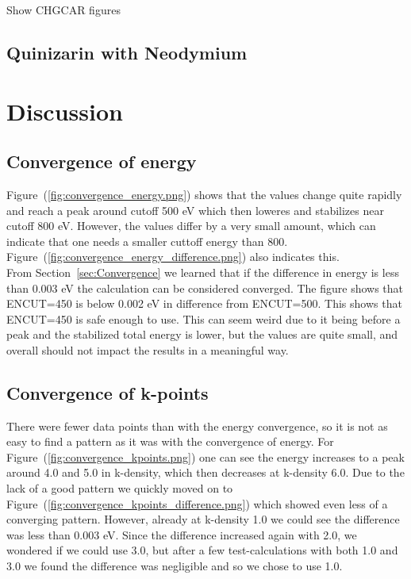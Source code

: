 \documentclass{article}
\begin{document}
      Show CHGCAR figures

  \subsection{Quinizarin with Neodymium}




\vspace{1cm}

\section{Discussion}    \label{sec:Discussion}

  \subsection{Convergence of energy}

    Figure~(\ref{fig:convergence_energy.png}) shows that the values change quite rapidly and reach a peak around cutoff 500 eV which then loweres and stabilizes near cutoff 800 eV. However, the values differ by a very small amount, which can indicate that one needs a smaller cuttoff energy than 800. Figure~(\ref{fig:convergence_energy_difference.png}) also indicates this. \\

    From Section~\ref{sec:Convergence} we learned that if the difference in energy is less than 0.003 eV the calculation can be considered converged. The figure shows that ENCUT=450 is below 0.002 eV in difference from ENCUT=500. This shows that ENCUT=450 is safe enough to use. This can seem weird due to it being before a peak and the stabilized total energy is lower, but the values are quite small, and overall should not impact the results in a meaningful way. \\

  \subsection{Convergence of k-points}

    There were fewer data points than with the energy convergence, so it is not as easy to find a pattern as it was with the convergence of energy. For Figure~(\ref{fig:convergence_kpoints.png}) one can see the energy increases to a peak around 4.0 and 5.0 in k-density, which then decreases at k-density 6.0. Due to the lack of a good pattern we quickly moved on to Figure~(\ref{fig:convergence_kpoints_difference.png}) which showed even less of a converging pattern. However, already at k-density 1.0 we could see the difference was less than 0.003 eV. Since the difference increased again with 2.0, we wondered if we could use 3.0, but after a few test-calculations with both 1.0 and 3.0 we found the difference was negligible and so we chose to use 1.0. \\
\end{document}
